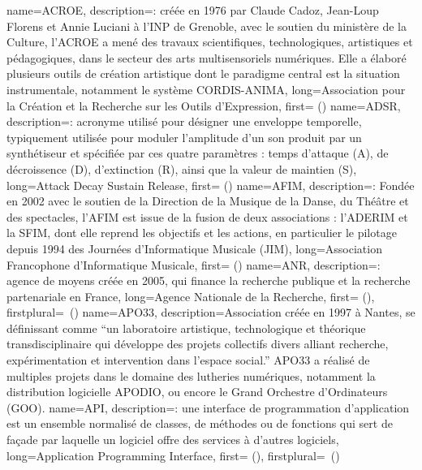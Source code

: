 {
    name={ACROE},
    description={\textit{}: créée en 1976 par Claude Cadoz, Jean-Loup Florens et Annie Luciani à l’INP de Grenoble, avec le soutien du ministère de la Culture, l'ACROE a mené des travaux scientifiques, technologiques, artistiques et pédagogiques, dans le secteur des arts multisensoriels numériques. Elle a élaboré plusieurs outils de création artistique dont le paradigme central est la situation instrumentale, notamment le système \gls{CORDIS-ANIMA}},
    long={Association pour la Création et la Recherche sur les Outils d'Expression},
    first={ ()}
}
{
    name={ADSR},
    description={\textit{}: acronyme utilisé pour désigner une enveloppe temporelle, typiquement utilisée pour moduler l'amplitude d'un son produit par un synthétiseur et spécifiée par ces quatre paramètres : temps d'attaque (A), de décroissence (D), d'extinction (R), ainsi que la valeur de maintien (S)},
    long={Attack Decay Sustain Release},
    first={ ()}
}
{
    name={AFIM},
    description={\textit{}: Fondée en 2002 avec le soutien de la Direction de la Musique de la Danse, du Théâtre et des spectacles, l’AFIM est issue de la fusion de deux associations : l’ADERIM et la SFIM, dont elle reprend les objectifs et les actions, en particulier le pilotage depuis 1994 des Journées d'Informatique Musicale (JIM)},
    long={Association Francophone d'Informatique Musicale},
    first={ ()}
}
{
    name={ANR},
    description={\textit{}: agence de moyens créée en 2005, qui finance la recherche publique et la recherche partenariale en France},
    long={Agence Nationale de la Recherche},
    first={ ()},
    firstplural={\glspluralsuffix\ (\glspluralsuffix)}
}
{
    name={APO33},
    description={Association créée en 1997 à Nantes, se définissant comme ``un laboratoire artistique, technologique et théorique transdisciplinaire qui développe des projets collectifs divers alliant recherche, expérimentation et intervention dans l’espace social.'' APO33 a réalisé de multiples projets dans le domaine des lutheries numériques, notamment la distribution logicielle APODIO, ou encore le Grand Orchestre d'Ordinateurs (GOO).}
}
{
    name={API},
    description={\textit{}: une interface de programmation d’application est un ensemble normalisé de classes, de méthodes ou de fonctions qui sert de façade par laquelle un logiciel offre des services à d'autres logiciels},
    long={Application Programming Interface},
    first={ ()},
    firstplural={\glspluralsuffix\ (\glspluralsuffix)}
}

